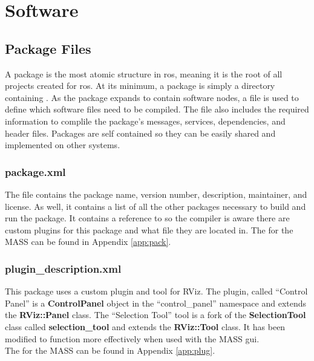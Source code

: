 \chapter{Software}
\label{chapp:code}
\section{Package Files}

A package is the most atomic structure in \acrshort{ros}, meaning it is the root of all projects created for \acrshort{ros}. At its minimum, a package is simply a directory containing . As the package expands to contain software nodes, a  file is used to define which software files need to be compiled. The  file also includes the required information to complile the package's messages, services, dependencies, and header files. Packages are self contained so they can be easily shared and implemented on other systems.\\

\subsection{package.xml}
The file  contains the package name, version number, description, maintainer, and license. As well, it contains a list of all the other packages necessary to build and run the package. It contains a reference to  so the compiler is aware there are custom plugins for this package and what file they are located in.
The  for the MASS can be found in Appendix \ref{app:pack}.
\subsection{plugin\_description.xml}
This package uses a custom plugin and tool for RViz. The plugin, called ``Control Panel'' is a \textbf{ControlPanel} object in the ``control\_panel'' namespace and extends the \textbf{RViz::Panel} class. The ``Selection Tool'' tool is a fork of the \textbf{SelectionTool} class called \textbf{selection\_tool} and extends the \textbf{RViz::Tool} class. It has been modified to function more effectively when used with the MASS \acrshort{gui}.\\

The  for the MASS can be found in Appendix \ref{app:plug}.
